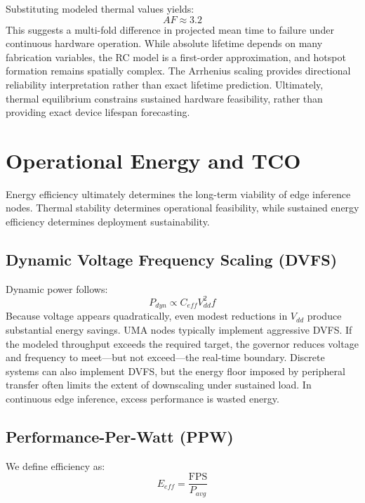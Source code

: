 \documentclass[conference]{IEEEtran}
\begin{document}
Substituting modeled thermal values yields:
\begin{equation}
AF \approx 3.2
\end{equation}
This suggests a multi-fold difference in projected mean time to failure under continuous hardware operation. While absolute lifetime depends on many fabrication variables, the RC model is a first-order approximation, and hotspot formation remains spatially complex. The Arrhenius scaling provides directional reliability interpretation rather than exact lifetime prediction. Ultimately, thermal equilibrium constrains sustained hardware feasibility, rather than providing exact device lifespan forecasting.

\section{Operational Energy and TCO}

Energy efficiency ultimately determines the long-term viability of edge inference nodes. Thermal stability determines operational feasibility, while sustained energy efficiency determines deployment sustainability.

\subsection{Dynamic Voltage Frequency Scaling (DVFS)}
Dynamic power follows:
\begin{equation}
P_{dyn} \propto C_{eff} V_{dd}^2 f
\end{equation}
Because voltage appears quadratically, even modest reductions in $V_{dd}$ produce substantial energy savings. UMA nodes typically implement aggressive DVFS. If the modeled throughput exceeds the required target, the governor reduces voltage and frequency to meet—but not exceed—the real-time boundary. Discrete systems can also implement DVFS, but the energy floor imposed by peripheral transfer often limits the extent of downscaling under sustained load. In continuous edge inference, excess performance is wasted energy.

\subsection{Performance-Per-Watt (PPW)}
We define efficiency as:
\begin{equation}
E_{eff} = \frac{\text{FPS}}{P_{avg}}
\end{equation}
\end{document}
